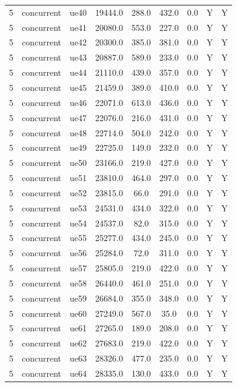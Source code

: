 \begin{table}[ht]
\begin{tabular}{|c|c|c|c|c|c|c|c|c|}
5 & concurrent & ue40 & 19444.0 & 288.0 & 432.0 & 0.0 & Y & Y \\
5 & concurrent & ue41 & 20080.0 & 553.0 & 227.0 & 0.0 & Y & Y \\
5 & concurrent & ue42 & 20300.0 & 385.0 & 381.0 & 0.0 & Y & Y \\
5 & concurrent & ue43 & 20887.0 & 589.0 & 233.0 & 0.0 & Y & Y \\
5 & concurrent & ue44 & 21110.0 & 439.0 & 357.0 & 0.0 & Y & Y \\
5 & concurrent & ue45 & 21459.0 & 389.0 & 410.0 & 0.0 & Y & Y \\
5 & concurrent & ue46 & 22071.0 & 613.0 & 436.0 & 0.0 & Y & Y \\
5 & concurrent & ue47 & 22076.0 & 216.0 & 431.0 & 0.0 & Y & Y \\
5 & concurrent & ue48 & 22714.0 & 504.0 & 242.0 & 0.0 & Y & Y \\
5 & concurrent & ue49 & 22725.0 & 149.0 & 232.0 & 0.0 & Y & Y \\
5 & concurrent & ue50 & 23166.0 & 219.0 & 427.0 & 0.0 & Y & Y \\
5 & concurrent & ue51 & 23810.0 & 464.0 & 297.0 & 0.0 & Y & Y \\
5 & concurrent & ue52 & 23815.0 & 66.0 & 291.0 & 0.0 & Y & Y \\
5 & concurrent & ue53 & 24531.0 & 434.0 & 322.0 & 0.0 & Y & Y \\
5 & concurrent & ue54 & 24537.0 & 82.0 & 315.0 & 0.0 & Y & Y \\
5 & concurrent & ue55 & 25277.0 & 434.0 & 245.0 & 0.0 & Y & Y \\
5 & concurrent & ue56 & 25284.0 & 72.0 & 311.0 & 0.0 & Y & Y \\
5 & concurrent & ue57 & 25805.0 & 219.0 & 422.0 & 0.0 & Y & Y \\
5 & concurrent & ue58 & 26440.0 & 461.0 & 251.0 & 0.0 & Y & Y \\
5 & concurrent & ue59 & 26684.0 & 355.0 & 348.0 & 0.0 & Y & Y \\
5 & concurrent & ue60 & 27249.0 & 567.0 & 35.0 & 0.0 & Y & Y \\
5 & concurrent & ue61 & 27265.0 & 189.0 & 208.0 & 0.0 & Y & Y \\
5 & concurrent & ue62 & 27683.0 & 219.0 & 422.0 & 0.0 & Y & Y \\
5 & concurrent & ue63 & 28326.0 & 477.0 & 235.0 & 0.0 & Y & Y \\
5 & concurrent & ue64 & 28335.0 & 130.0 & 433.0 & 0.0 & Y & Y \\

\end{tabular}
\end{table}
